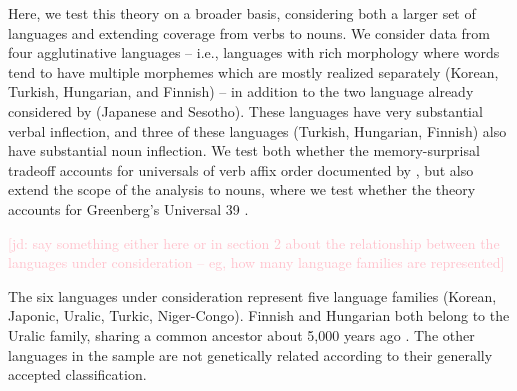 \documentclass[11pt,letterpaper]{article}
\newcommand{\citep}{\parencite}
\newcommand{\citet}{\Textcite}
\newcommand\mhahn[1]{{\color{red}(#1)}}
\newcommand{\jd}[1]{\textcolor{Pink}{[jd: #1]}}
\begin{document}


Here, we test this theory on a broader basis, considering both a larger set of languages and extending coverage from verbs to nouns.
We consider data from four agglutinative languages -- i.e., languages with rich morphology where words tend to have multiple morphemes which are mostly realized separately (Korean, Turkish, Hungarian, and Finnish) -- in addition to the two language already considered by \citet{Hahn2020modeling} (Japanese and Sesotho).
These languages have very substantial verbal inflection, and three of these languages (Turkish, Hungarian, Finnish) also have substantial noun inflection. We test both whether the memory-surprisal tradeoff accounts for universals of verb affix order documented by \cite{bybee-morphology-1985}, but also extend the scope of the analysis to nouns, where we test whether the theory accounts for Greenberg's Universal 39 \citep{greenberg-universals-1963}. %

\jd{say something either here or in section 2 about the relationship between the languages under consideration -- eg, how many language families are represented}

The six languages under consideration represent five language families (Korean, Japonic, Uralic, Turkic, Niger-Congo).
Finnish and Hungarian both belong to the Uralic family, sharing a common ancestor about 5,000 years ago \citep{maurits2020best}.
The other languages in the sample are not genetically related according to their generally accepted classification.




\end{document}
